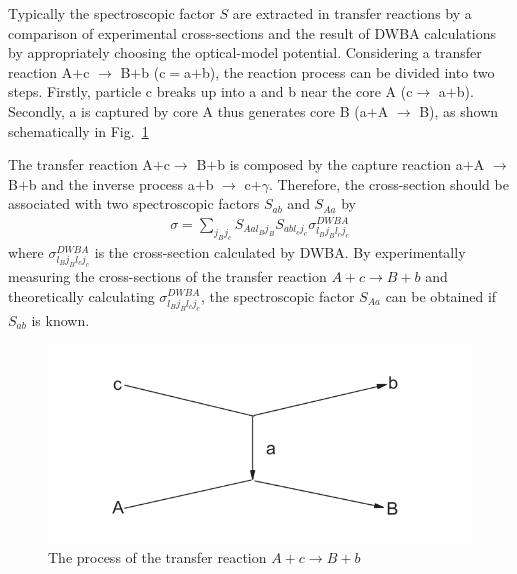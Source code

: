 Typically the spectroscopic factor $S$ are extracted in transfer reactions by a comparison of experimental cross-sections and the result of DWBA calculations by appropriately choosing the optical-model potential. Considering a transfer reaction A$+$c $\rightarrow$ B$+$b (c$=$a$+$b), the reaction process can be divided into two steps. Firstly, particle c breaks up into a and b near the core A (c$\rightarrow$ a$+$b). Secondly, a is captured by core A thus generates core B (a$+$A $\rightarrow$ B), as  shown schematically in Fig.~\ref{fig:transfer}

The transfer reaction A$+$c$\rightarrow$ B$+$b is composed by the capture reaction a$+$A $\rightarrow$ B$+$b and the inverse process a$+$b $\rightarrow$ c$+$$\gamma$. Therefore, the cross-section should be associated with  two spectroscopic factors $S_{ab}$ and $S_{Aa}$ by
\begin{equation}
    \label{transfer_crosssection}
    \begin{aligned}
    \sigma  = \sum_{j_B j_c} S_{A a l_B j_B} S_{a b l_c j_c} \sigma^{DWBA}_{l_B j_B l_c j_c}
    \end{aligned}
\end{equation}
 where $\sigma^{DWBA}_{l_B j_B l_c j_c}$ is the cross-section calculated by DWBA. By experimentally measuring the cross-sections of the transfer reaction $A+c \rightarrow B+b$ and theoretically  calculating $\sigma^{DWBA}_{l_B j_B l_c j_c}$,  the  spectroscopic  factor $S_{Aa}$ can be obtained if $S_{ab}$ is known.

\begin{figure}[tpb]
  \begin{center}
    \centerline{\includegraphics[scale=0.6]{graph/ch2/transfer}}
    \caption{The process of the transfer reaction  $A+c \rightarrow B+b$}
    \label{fig:transfer}
  \end{center}
\end{figure}

